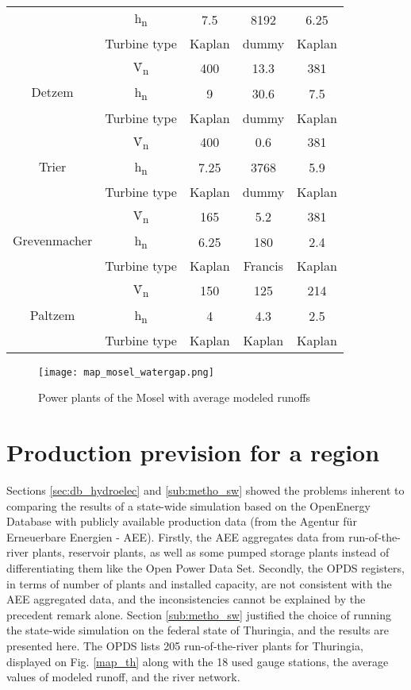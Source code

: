 \begin{longtable}{|c|c|c|c|c|}
  &h\textsubscript{n}&7.5&8192&6.25\\
  &Turbine type&Kaplan&dummy&Kaplan\\
  \hline
  \multirow{3}{*}{Detzem}&\.V\textsubscript{n}&400&13.3&381\\
  &h\textsubscript{n}&9&30.6&7.5\\
  &Turbine type&Kaplan&dummy&Kaplan\\
  \hline
  \multirow{3}{*}{Trier}&\.V\textsubscript{n}&400&0.6&381\\
  &h\textsubscript{n}&7.25&3768&5.9\\
  &Turbine type&Kaplan&dummy&Kaplan\\
  \hline
  \multirow{3}{*}{Grevenmacher}&\.V\textsubscript{n}&165&5.2&381\\
  &h\textsubscript{n}&6.25&180&2.4\\
  &Turbine type&Kaplan&Francis&Kaplan\\
  \hline
  \multirow{3}{*}{Paltzem}&\.V\textsubscript{n}&150&125&214\\
  &h\textsubscript{n}&4&4.3&2.5\\
  &Turbine type&Kaplan&Kaplan&Kaplan\\
\end{longtable}
\endgroup

\begin{figure}[H]
\centering
\texttt{[image: map\_mosel\_watergap.png]}
\caption{Power plants of the Mosel with average modeled runoffs}
\label{map_mosel_watergap}
\end{figure}

\section{Production prevision for a region}
\label{sec:res_th}

Sections \ref{sec:db_hydroelec} and \ref{sub:metho_sw} showed the problems inherent to comparing the results of a state-wide simulation based on the OpenEnergy Database with publicly available production data (from the Agentur für Erneuerbare Energien - AEE). Firstly, the AEE aggregates data from run-of-the-river plants, reservoir plants, as well as some pumped storage plants instead of differentiating them like the Open Power Data Set. Secondly, the OPDS registers, in terms of number of plants and installed capacity, are not consistent with the AEE aggregated data, and the inconsistencies cannot be explained by the precedent remark alone. \newline
Section \ref{sub:metho_sw} justified the choice of running the state-wide simulation on the federal state of Thuringia, and the results are presented here. \newline
The OPDS lists 205 run-of-the-river plants for Thuringia, displayed on Fig. \ref{map_th} along with the 18 used gauge stations, the average values of modeled runoff, and the river network.

